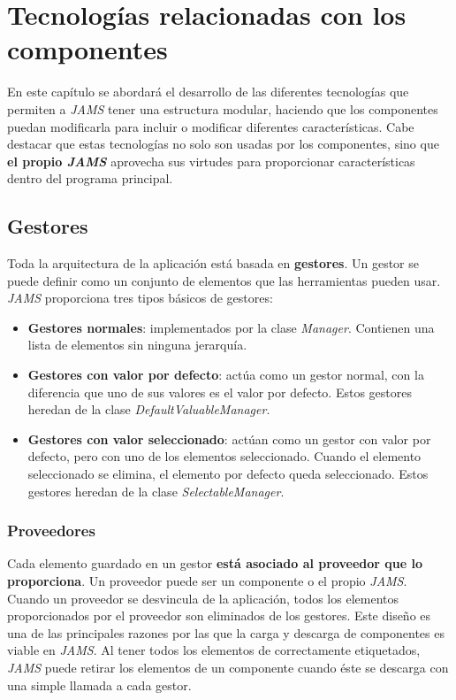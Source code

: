 \chapter{Tecnologías relacionadas con los componentes}\label{ch:tecnologias-relacionadas-con-los-componentes}

En este capítulo se abordará el desarrollo de las
diferentes tecnologías que permiten a \textit{JAMS}
tener una estructura modular, haciendo que los
componentes puedan modificarla para incluir o modificar
diferentes características.
Cabe destacar que estas tecnologías no solo son usadas
por los componentes, sino que \textbf{el propio \textit{JAMS}}
aprovecha sus virtudes para proporcionar características
dentro del programa principal.

\section{Gestores}\label{sec:gestores}

Toda la arquitectura de la aplicación está basada en \textbf{gestores}.
Un gestor se puede definir como un conjunto de elementos que las herramientas pueden usar.
\textit{JAMS} proporciona tres tipos básicos de gestores:
\begin{itemize}
    \item \textbf{Gestores normales}: implementados por la clase \textit{Manager}.
    Contienen una lista de elementos sin ninguna jerarquía.
    \item \textbf{Gestores con valor por defecto}: actúa como un gestor normal, con la
    diferencia que uno de sus valores es el valor por defecto.
    Estos gestores heredan de la clase \textit{DefaultValuableManager}.
    \item \textbf{Gestores con valor seleccionado}: actúan como un gestor con valor por defecto,
    pero con uno de los elementos seleccionado.
    Cuando el elemento seleccionado se elimina, el elemento por defecto queda seleccionado.
    Estos gestores heredan de la clase \textit{SelectableManager}.
\end{itemize}

\subsection{Proveedores}\label{subsec:proveedores}

Cada elemento guardado en un gestor \textbf{está asociado al proveedor que lo proporciona}.
Un proveedor puede ser un componente o el propio \textit{JAMS}.
Cuando un proveedor se desvincula de la aplicación, todos los elementos proporcionados
por el proveedor son eliminados de los gestores.
Este diseño es una de las principales razones por las que la carga y descarga de
componentes es viable en \textit{JAMS}.
Al tener todos los elementos de correctamente etiquetados, \textit{JAMS}
puede retirar los elementos de un componente cuando éste se
descarga con una simple llamada a cada gestor.

